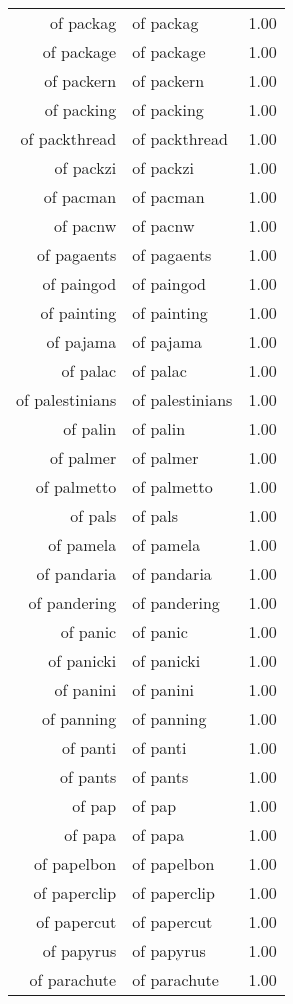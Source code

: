 \begin{table}[ht]
\begin{tabular}{rlr}
  of packag & of packag & 1.00 \\ 
  of package & of package & 1.00 \\ 
  of packern & of packern & 1.00 \\ 
  of packing & of packing & 1.00 \\ 
  of packthread & of packthread & 1.00 \\ 
  of packzi & of packzi & 1.00 \\ 
  of pacman & of pacman & 1.00 \\ 
  of pacnw & of pacnw & 1.00 \\ 
  of pagaents & of pagaents & 1.00 \\ 
  of paingod & of paingod & 1.00 \\ 
  of painting & of painting & 1.00 \\ 
  of pajama & of pajama & 1.00 \\ 
  of palac & of palac & 1.00 \\ 
  of palestinians & of palestinians & 1.00 \\ 
  of palin & of palin & 1.00 \\ 
  of palmer & of palmer & 1.00 \\ 
  of palmetto & of palmetto & 1.00 \\ 
  of pals & of pals & 1.00 \\ 
  of pamela & of pamela & 1.00 \\ 
  of pandaria & of pandaria & 1.00 \\ 
  of pandering & of pandering & 1.00 \\ 
  of panic & of panic & 1.00 \\ 
  of panicki & of panicki & 1.00 \\ 
  of panini & of panini & 1.00 \\ 
  of panning & of panning & 1.00 \\ 
  of panti & of panti & 1.00 \\ 
  of pants & of pants & 1.00 \\ 
  of pap & of pap & 1.00 \\ 
  of papa & of papa & 1.00 \\ 
  of papelbon & of papelbon & 1.00 \\ 
  of paperclip & of paperclip & 1.00 \\ 
  of papercut & of papercut & 1.00 \\ 
  of papyrus & of papyrus & 1.00 \\ 
  of parachute & of parachute & 1.00 \\ 

\end{tabular}
\end{table}
